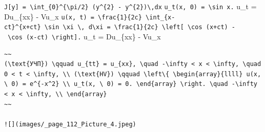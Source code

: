 \documentclass[
  ukrainian,
]{article}
\begin{document}
\texttt{J{[}y{]}\ =\ \textbackslash{}int\_\{0\}\^{}\{\textbackslash{}pi/2\}\ (y\textquotesingle{}\^{}\{2\}\ -\ y\^{}\{2\})\textbackslash{},dx}
\texttt{u\_t(x,\ 0)\ =\ \textbackslash{}sin\ x.} u\_t = Du\_\{xx\} -
Vu\_x
\texttt{u(x,\ t)\ =\ \textbackslash{}frac\{1\}\{2c\}\ \textbackslash{}int\_\{x-ct\}\^{}\{x+ct\}\ \textbackslash{}sin\ \textbackslash{}xi\ \textbackslash{},\ d\textbackslash{}xi\ =\ \textbackslash{}frac\{1\}\{2c\}\ \textbackslash{}left{[}\ \textbackslash{}cos\ (x+ct)\ -\ \textbackslash{}cos\ (x-ct)\ \textbackslash{}right{]}.}
u\_t = Du\_\{xx\} - Vu\_x

\begin{verbatim}
~~
(\text{УЧП}) \qquad u_{tt} = u_{xx}, \quad -\infty < x < \infty, \quad 0 < t < \infty, \\ (\text{HV}) \qquad \left\{ \begin{array}{llll} u(x, \ 0) = e^{-x^2} \\ u_t(x, \ 0) = 0. \end{array} \right. \quad -\infty < x < \infty, \\ \end{array}
~~

![](images/_page_112_Picture_4.jpeg)
\end{verbatim}
\end{document}
